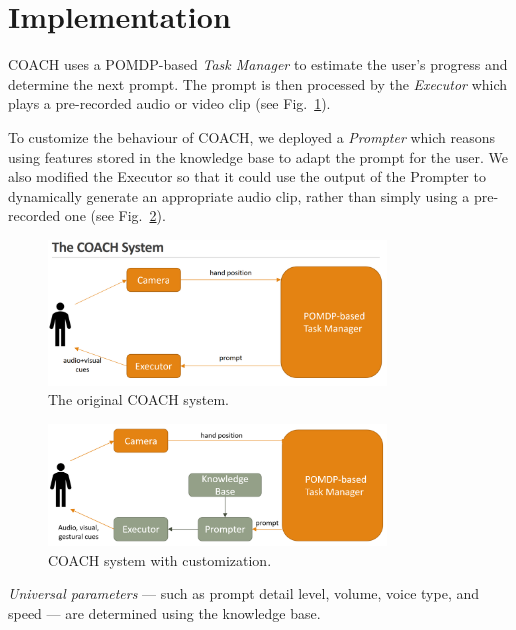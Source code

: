 \documentclass[11pt,a4paper, final, twoside]{article}
\theoremstyle{proposition}
\theoremstyle{definition}
\theoremstyle{remark}
\numberwithin{equation}{section}
\begin{document}
\section{Implementation}\label{I3}
COACH uses a POMDP-based \emph{Task Manager} to estimate the user's progress and determine the next prompt.
The prompt is then processed by the \emph{Executor} which plays a pre-recorded audio or video clip
(see Fig.~\ref{fig:COACH}).

To customize the behaviour of COACH, we deployed a \emph{Prompter} which reasons using features stored in the knowledge base to adapt the prompt for the user. 
We also modified the Executor so that it could use the output of the Prompter to dynamically generate an appropriate audio clip, rather than simply using a pre-recorded one (see Fig.~\ref{fig:COACH_with_customization}).
\begin{figure}[h!]
        \centering
        \includegraphics[width=0.8\textwidth]{COACH_prompt.png}
        \caption{The original COACH system.}
        \label{fig:COACH}
\end{figure}
\begin{figure}[h!]
        \centering
        \includegraphics[width=0.8\textwidth]{COACH_with_customization_prompt.png}
        \caption{COACH system with customization.}
        \label{fig:COACH_with_customization}
\end{figure}
\par
\emph{Universal parameters} --- such as prompt detail level, volume, voice type, and speed --- are determined using  the knowledge base.
\end{document}
